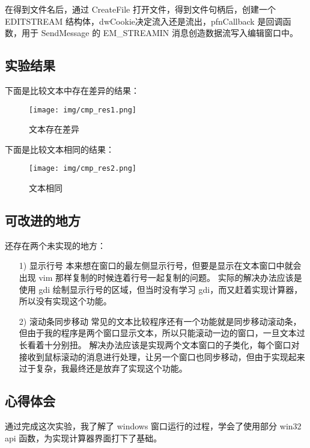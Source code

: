 \documentclass[proposal-report]{bitart}
\begin{document}
在得到文件名后，通过 CreateFile 打开文件，得到文件句柄后，创建一个 EDITSTREAM 结构体，dwCookie决定流入还是流出，pfnCallback 是回调函数，用于 SendMessage 的 EM\_STREAMIN 消息创造数据流写入编辑窗口中。

\subsection{实验结果}

下面是比较文本中存在差异的结果：

\begin{figure}[H]
  \centering
  \texttt{[image: img/cmp\_res1.png]}
  \caption{文本存在差异}
\end{figure}

下面是比较文本相同的结果：

\begin{figure}[H]
  \centering
  \texttt{[image: img/cmp\_res2.png]}
  \caption{文本相同}
\end{figure}

\subsection{可改进的地方}

还存在两个未实现的地方：

\begin{itemize}
  \item [1)] 显示行号
    \subitem 本来想在窗口的最左侧显示行号，但要是显示在文本窗口中就会出现 vim 那样复制的时候连着行号一起复制的问题。
    \subitem 实际的解决办法应该是使用 gdi 绘制显示行号的区域，但当时没有学习 gdi，而又赶着实现计算器，所以没有实现这个功能。
  \item [2)]  滚动条同步移动
    \subitem 常见的文本比较程序还有一个功能就是同步移动滚动条，但由于我的程序是两个窗口显示文本，所以只能滚动一边的窗口，一旦文本过长看着十分别扭。
    \subitem 解决办法应该是实现两个文本窗口的子类化，每个窗口对接收到鼠标滚动的消息进行处理，让另一个窗口也同步移动，但由于实现起来过于复杂，我最终还是放弃了实现这个功能。
    
\end{itemize}

\subsection{心得体会}

通过完成这次实验，我了解了 windows 窗口运行的过程，学会了使用部分 win32 api 函数，为实现计算器界面打下了基础。
\end{document}
